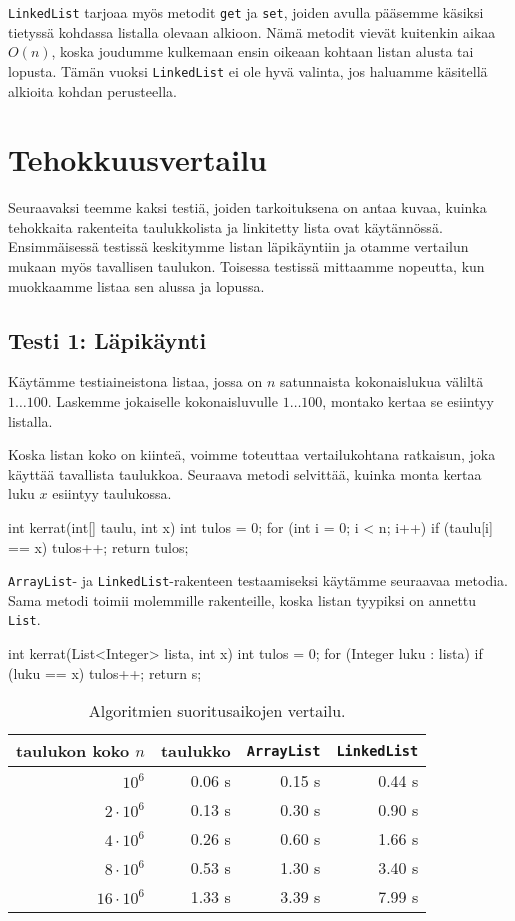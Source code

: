 \texttt{LinkedList} tarjoaa myös metodit
\texttt{get} ja \texttt{set}, joiden avulla
pääsemme käsiksi tietyssä kohdassa listalla olevaan alkioon.
Nämä metodit vievät kuitenkin aikaa $O(n)$,
koska joudumme kulkemaan ensin oikeaan kohtaan listan
alusta tai lopusta.
Tämän vuoksi \texttt{LinkedList} ei ole hyvä valinta,
jos haluamme käsitellä alkioita kohdan perusteella.

\section{Tehokkuusvertailu}

Seuraavaksi teemme kaksi testiä, joiden tarkoituksena on
antaa kuvaa, kuinka tehokkaita rakenteita
taulukkolista ja linkitetty lista ovat käytännössä.
Ensimmäisessä testissä keskitymme listan läpikäyntiin ja otamme
vertailun mukaan myös tavallisen taulukon.
Toisessa testissä mittaamme nopeutta, kun muokkaamme listaa
sen alussa ja lopussa.

\subsection{Testi 1: Läpikäynti}

Käytämme testiaineistona listaa, jossa on $n$ satunnaista
kokonaislukua väliltä $1 \dots 100$.
Laskemme jokaiselle kokonaisluvulle $1 \dots 100$,
montako kertaa se esiintyy listalla.

Koska listan koko on kiinteä, voimme toteuttaa vertailukohtana
ratkaisun, joka käyttää tavallista taulukkoa.
Seuraava metodi selvittää, kuinka monta kertaa luku $x$
esiintyy taulukossa.

\begin{code}
int kerrat(int[] taulu, int x) {
    int tulos = 0;
    for (int i = 0; i < n; i++) {
        if (taulu[i] == x) tulos++;
    }
    return tulos;
}
\end{code}

\texttt{ArrayList}- ja \texttt{LinkedList}-rakenteen
testaamiseksi käytämme seuraavaa metodia.
Sama metodi toimii molemmille rakenteille,
koska listan tyypiksi on annettu \texttt{List}.

\begin{code}
int kerrat(List<Integer> lista, int x) {
    int tulos = 0;
    for (Integer luku : lista) {
        if (luku == x) tulos++;
    }
    return s;
}
\end{code}

\begin{table}
\center
\begin{tabular}{rrrr}
taulukon koko $n$ & taulukko & \texttt{ArrayList} & \texttt{LinkedList} \\
\hline
$10^6$ & 0.06 s & 0.15 s & 0.44 s \\
$2 \cdot 10^6$ & 0.13 s & 0.30 s & 0.90 s \\
$4 \cdot 10^6$ & 0.26 s & 0.60 s & 1.66 s \\
$8 \cdot 10^6$ & 0.53 s & 1.30 s & 3.40 s \\
$16 \cdot 10^6$ & 1.33 s & 3.39 s & 7.99 s \\
\end{tabular}
\caption{Algoritmien suoritusaikojen vertailu.}
\label{tab:kerver}
\end{table}

